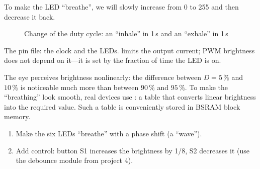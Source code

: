 To make the LED ``breathe'', we will slowly increase  from 0 to 255
and then decrease it back.

\begin{figure}[H]
\centering
{}
\caption{Change of the duty cycle: an ``inhale'' in 1\,s and an ``exhale'' in 1\,s}
\end{figure}


The pin file: the clock and the LEDs.  limits the output current;
PWM brightness does not depend on it---it is set by the fraction of time the
LED is on.


\begin{infobox}
The eye perceives brightness nonlinearly: the difference between $D=5\,\%$ and $10\,\%$ is noticeable
much more than between $90\,\%$ and $95\,\%$. To make the ``breathing'' look
smooth, real devices use : a table
that converts linear brightness into the required  value. Such a table
is conveniently stored in BSRAM block memory.
\end{infobox}

\begin{taskbox}
\begin{enumerate}
  \item Make the six LEDs ``breathe'' with a phase shift
        (a ``wave'').
  \item Add control: button S1 increases the brightness by 1/8, S2
        decreases it (use the debounce module from project 4).
\end{enumerate}
\end{taskbox}

